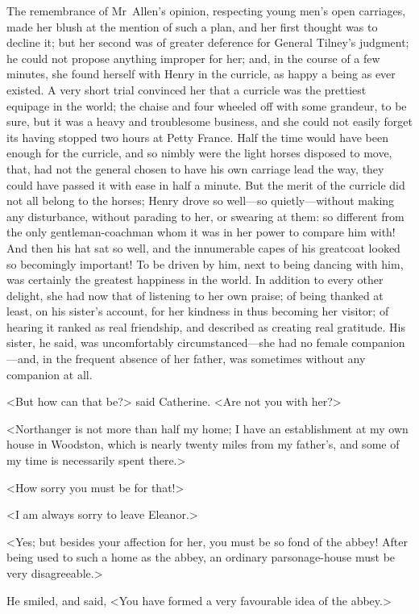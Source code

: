  The remembrance of Mr~Allen's opinion, respecting young men's open carriages, made her blush at the mention of such a plan, and her first thought was to decline it; but her second was of greater deference for General Tilney's judgment; he could not propose anything improper for her; and, in the course of a few minutes, she found herself with Henry in the curricle, as happy a being as ever existed. A very short trial convinced her that a curricle was the prettiest equipage in the world; the chaise and four wheeled off with some grandeur, to be sure, but it was a heavy and troublesome business, and she could not easily forget its having stopped two hours at Petty France. Half the time would have been enough for the curricle, and so nimbly were the light horses disposed to move, that, had not the general chosen to have his own carriage lead the way, they could have passed it with ease in half a minute. But the merit of the curricle did not all belong to the horses; Henry drove so well—so quietly—without making any disturbance, without parading to her, or swearing at them: so different from the only gentleman-coachman whom it was in her power to compare him with! And then his hat sat so well, and the innumerable capes of his greatcoat looked so becomingly important! To be driven by him, next to being dancing with him, was certainly the greatest happiness in the world. In addition to every other delight, she had now that of listening to her own praise; of being thanked at least, on his sister's account, for her kindness in thus becoming her visitor; of hearing it ranked as real friendship, and described as creating real gratitude. His sister, he said, was uncomfortably circumstanced—she had no female companion—and, in the frequent absence of her father, was sometimes without any companion at all. 

 <But how can that be?> said Catherine. <Are not you with her?> 

 <Northanger is not more than half my home; I have an establishment at my own house in Woodston, which is nearly twenty miles from my father's, and some of my time is necessarily spent there.> 

 <How sorry you must be for that!> 

 <I am always sorry to leave Eleanor.> 

 <Yes; but besides your affection for her, you must be so fond of the abbey! After being used to such a home as the abbey, an ordinary parsonage-house must be very disagreeable.> 

 He smiled, and said, <You have formed a very favourable idea of the abbey.> 

